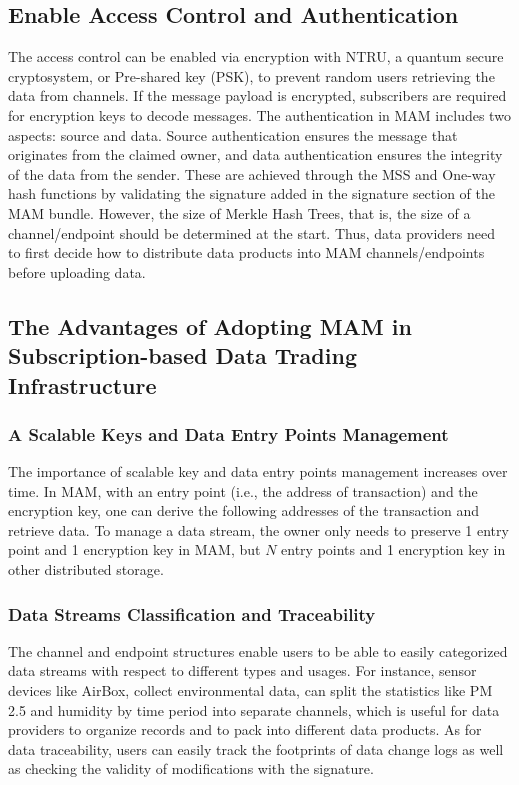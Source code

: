 \begin{spacing}{2.0}
\subsection{Enable Access Control and Authentication}
\label{section:mam_functions}
The access control can be enabled via encryption with NTRU\cite{NTRU}, a quantum secure cryptosystem, or Pre-shared key (PSK), to prevent random users retrieving the data from channels. If the message payload is encrypted, subscribers are required for encryption keys to decode messages. The authentication in MAM includes two aspects: source and data. Source authentication ensures the message that originates from the claimed owner, and data authentication ensures the integrity of the data from the sender. These are achieved through the MSS and One-way hash functions by validating the signature added in the signature section of the MAM bundle. However, the size of Merkle Hash Trees, that is, the size of a channel/endpoint should be determined at the start. Thus, data providers need to first decide how to distribute data products into MAM channels/endpoints before uploading data.

\subsection{The Advantages of Adopting MAM in Subscription-based Data Trading Infrastructure}
\label{section:mam_features}
\subsubsection{A Scalable Keys and Data Entry Points Management}
The importance of scalable key and data entry points management increases over time. In MAM, with an entry point (i.e., the address of transaction) and the encryption key, one can derive the following addresses of the transaction and retrieve data. To manage a data stream, the owner only needs to preserve 1 entry point and 1 encryption key in MAM, but $N$ entry points and 1 encryption key in other distributed storage.
\clearpage

\subsubsection{Data Streams Classification and Traceability}
The channel and endpoint structures enable users to be able to easily categorized data streams with respect to different types and usages. For instance, sensor devices like AirBox\cite{LASS}, collect environmental data, can split the statistics like PM 2.5 and humidity by time period into separate channels, which is useful for data providers to organize records and to pack into different data products. As for data traceability, users can easily track the footprints of data change logs as well as checking the validity of modifications with the signature.


\end{spacing}
